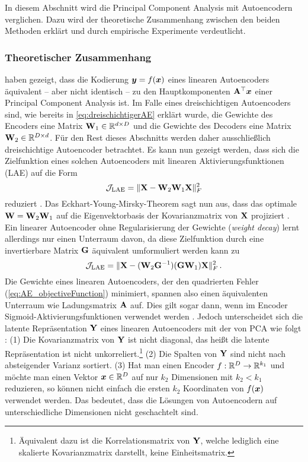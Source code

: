 In diesem Abschnitt wird die Principal Component Analysis mit Autoencodern verglichen. Dazu wird
der theoretische Zusammenhang zwischen den beiden Methoden erklärt und durch empirische Experimente
verdeutlicht.

\subsubsection{Theoretischer Zusammenhang}

\textcites{Baldi.1989}{Bourlard.1988} haben gezeigt, dass die Kodierung $\bm{y} = f(\bm{x})$ eines linearen Autoencoders äquivalent -- aber nicht identisch -- zu den Hauptkomponenten $\mathbf{A}^\top\bm{x}$ einer Principal Component Analysis ist. Im Falle eines dreischichtigen Autoencoders sind, wie bereits in \eqref{eq:dreischichtigerAE} erklärt wurde, die Gewichte des Encoders eine Matrix $\mathbf{W}_1 \in \mathbb{R}^{d \times D}$ und die Gewichte des
Decoders eine Matrix $\mathbf{W}_2 \in \mathbb{R}^{D \times d}$. Für den Rest dieses Abschnitts werden daher ausschließlich dreischichtige Autoencoder betrachtet. Es kann nun gezeigt werden, dass sich die Zielfunktion eines solchen Autoencoders mit linearen Aktivierungsfunktionen (LAE) auf die Form
\begin{equation}
	\mathcal{J}_{\text{LAE}} = \lVert\mathbf{X} - \mathbf{W}_2\mathbf{W}_1\mathbf{X}\rVert_F^2
\end{equation}
reduziert \parencite[292]{Bourlard.1988}. Das Eckhart-Young-Mirsky-Theorem \parencite{Eckart.1936} sagt nun aus, dass das optimale $\mathbf{W} = \mathbf{W}_2 \mathbf{W}_1$ auf die
Eigenvektorbasis der Kovarianzmatrix von $\mathbf{X}$ projiziert \parencite[vgl.][1]{Kunin.2019}. Ein linearer Autoencoder ohne Regularisierung der Gewichte
(\textit{weight decay}) lernt allerdings nur einen Unterraum davon, da diese Zielfunktion durch
eine invertierbare Matrix $\mathbf{G}$ äquivalent umformuliert werden kann zu \parencite[1]{Kunin.2019}
\begin{equation}
	\mathcal{J}_{\text{LAE}} = \lVert\mathbf{X} - (\mathbf{W}_2\mathbf{G}^{-1}) (\mathbf{G} \mathbf{W}_1)\mathbf{X}\rVert_F^2 \, .
\end{equation}
Die Gewichte eines linearen Autoencoders, der den quadrierten Fehler
(\eqref{eq:AE_objectiveFunction}) minimiert, spannen also einen äquivalenten Unterraum wie
Ladungsmatrix $\mathbf{A}$ auf. Dies gilt sogar dann, wenn im Encoder Sigmoid-Aktivierungsfunktionen verwendet werden \parencite[291, 293]{Bourlard.1988}. Jedoch unterscheidet sich die latente Repräsentation $\mathbf{Y}$
eines linearen Autoencoders mit der von PCA wie folgt \parencite[3]{Plaut.2018}: (1) Die Kovarianzmatrix von $\mathbf{Y}$ ist nicht diagonal, das heißt die
latente Repräsentation ist nicht unkorreliert.\footnote{Äquivalent dazu ist die Korrelationsmatrix
	von $\mathbf{Y}$, welche lediglich eine skalierte Kovarianzmatrix darstellt, keine Einheitsmatrix.}
(2) Die Spalten von $\mathbf{Y}$ sind nicht nach absteigender Varianz sortiert. (3) Hat man einen
Encoder $f: \mathbb{R}^D \rightarrow \mathbb{R}^{k_1}$ und möchte man einen Vektor $\bm{x} \in \mathbb{R}^D$ auf
nur $k_2$ Dimensionen mit $k_2 < k_1$ reduzieren, so können nicht einfach die ersten $k_2$
Koordinaten von $f(\bm{x})$ verwendet werden. Das bedeutet, dass die Lösungen von Autoencodern
auf unterschiedliche Dimensionen nicht geschachtelt sind.

